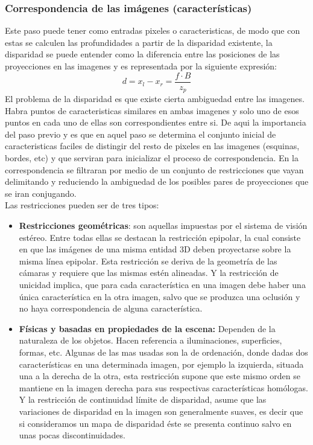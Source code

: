 \subsubsection{Correspondencia de las imágenes (características)}
Este paso puede tener como entradas pixeles o caracteristicas, de modo que con estas se calculen las profundidades a partir de la disparidad existente, la disparidad se puede entender como la diferencia entre las posiciones de las proyecciones en las imagenes y es representada por la siguiente expresión:
\begin{equation}
d = x_{l} - x_{r} = \frac{f\cdot B}{z_{p}}
\end{equation}
El problema de la disparidad es que existe cierta ambiguedad entre las imagenes. Habra puntos de caracteristicas similares en ambas imagenes y solo uno de esos puntos en cada uno de ellas son correspondientes entre si. De aqui la importancia del paso previo y es que en aquel paso se determina el conjunto inicial de caracteristicas faciles de distingir del resto de pixeles en las imagenes (esquinas, bordes, etc) y que serviran para inicializar el proceso de correspondencia. En la correspondencia se filtraran por medio de un conjunto de restricciones que vayan delimitando y reduciendo la ambiguedad de los posibles pares de proyecciones que se iran conjugando.
\\
Las restricciones pueden ser de tres tipos:
\begin{itemize}
\item\textbf{ Restricciones geométricas}: son aquellas impuestas por el sistema de visión estéreo. Entre todas ellas se destacan la restricción epipolar, la cual consiste en que las imágenes de una misma entidad 3D deben proyectarse sobre la misma línea epipolar. Esta restricción se deriva de la geometría de las cámaras y requiere que las mismas estén alineadas. Y la restricción de unicidad implica, que para cada característica en una imagen debe haber una única característica en la otra imagen, salvo que se produzca una oclusión y no haya correspondencia de alguna característica.
\item \textbf{Físicas y basadas en propiedades de la escena:} Dependen de la naturaleza de los objetos. Hacen  referencia a iluminaciones, superficies, formas, etc. Algunas de las mas usadas son la de ordenación, donde dadas dos características en una determinada imagen, por ejemplo la izquierda, situada una a la derecha de la otra, esta restricción supone que este mismo orden se mantiene en la imagen derecha para sus respectivas características homólogas. Y la restricción de continuidad límite de disparidad, asume que las variaciones de disparidad en la imagen son generalmente suaves, es decir que si consideramos un mapa de disparidad éste se presenta continuo salvo en unas pocas discontinuidades.
\end{itemize}
